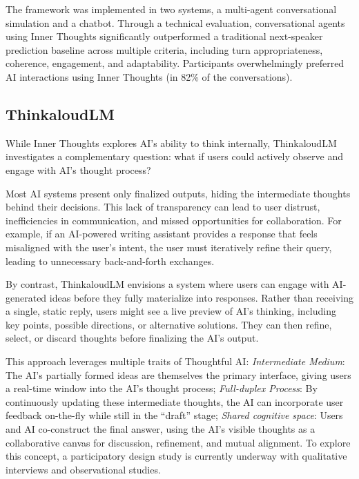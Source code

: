The framework was implemented in two systems, a multi-agent conversational simulation and a chatbot. Through a technical evaluation, conversational agents using Inner Thoughts significantly outperformed a traditional next-speaker prediction baseline across multiple criteria, including turn appropriateness, coherence, engagement, and adaptability.
Participants overwhelmingly preferred AI interactions using Inner Thoughts (in 82\% of the conversations).



\subsection{ThinkaloudLM}

While Inner Thoughts explores AI's ability to think internally, ThinkaloudLM investigates a complementary question: what if users could actively observe and engage with AI's thought process?

Most AI systems present only finalized outputs, hiding the intermediate thoughts behind their decisions. This lack of transparency can lead to user distrust, inefficiencies in communication, and missed opportunities for collaboration. For example, if an AI-powered writing assistant provides a response that feels misaligned with the user’s intent, the user must iteratively refine their query, leading to unnecessary back-and-forth exchanges.

By contrast, ThinkaloudLM envisions a system where users can engage with AI-generated ideas before they fully materialize into responses. Rather than receiving a single, static reply, users might see a live preview of AI’s thinking, including key points, possible directions, or alternative solutions. They can then refine, select, or discard thoughts before finalizing the AI’s output.

This approach leverages multiple traits of Thoughtful AI:
\textit{Intermediate Medium}: The AI’s partially formed ideas are themselves the primary interface, giving users a real-time window into the AI’s thought process; \textit{Full-duplex Process}: By continuously updating these intermediate thoughts, the AI can incorporate user feedback on-the-fly while still in the ``draft'' stage; \textit{Shared cognitive space}: Users and AI co-construct the final answer, using the AI's visible thoughts as a collaborative canvas for discussion, refinement, and mutual alignment.
To explore this concept, a participatory design study is currently underway with qualitative interviews and observational studies. 